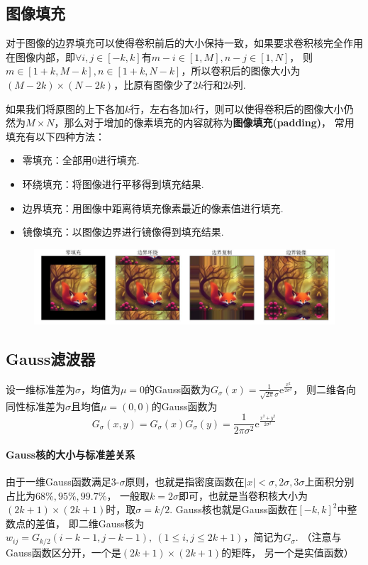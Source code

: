 \documentclass[12pt, a4paper, oneside]{ctexart}
\numberwithin{equation}{section}  %
\theoremstyle{definition}
\let\leq=\leqslant %
\def\e{\mathrm{e}}          %
\def\add{\vspace{1ex}}      %
\def\del{\vspace{-1.5ex}}   %
\begin{document}
\subsection{图像填充}
对于图像的边界填充可以使得卷积前后的大小保持一致，如果要求卷积核完全作用在图像内部，即$\forall i,j\in[-k,k]$有$m-i\in[1,M],n-j\in[1,N]$，
则$m\in[1+k,M-k],n\in[1+k,N-k]$，所以卷积后的图像大小为$(M-2k)\times(N-2k)$，比原有图像少了$2k$行和$2k$列.

如果我们将原图的上下各加$k$行，左右各加$k$行，则可以使得卷积后的图像大小仍然为$M\times N$，那么对于增加的像素填充的内容就称为\textbf{图像填充(padding)}，
常用填充有以下四种方法：
\begin{itemize}
    \item 零填充：全部用$0$进行填充.
    \item 环绕填充：将图像进行平移得到填充结果.
    \item 边界填充：用图像中距离待填充像素最近的像素值进行填充.
    \item 镜像填充：以图像边界进行镜像得到填充结果.
\end{itemize}
\begin{figure}[htbp]
    \centering
    \hspace*{-1.2cm}
    \includegraphics[scale=0.4]{图像填充.png}
\end{figure}

\subsection{Gauss滤波器}

设一维标准差为$\sigma$，均值为$\mu=0$的Gauss函数为$G_{\sigma}(x) = \frac{1}{\sqrt{2\pi}\sigma}\e^{\frac{x^2}{2\sigma^2}}$，
\add 则二维各向同性标准差为$\sigma$且均值$\mu=(0,0)$的Gauss函数为\del
\begin{equation*}
G_{\sigma}(x, y) = G_\sigma(x)G_\sigma(y) = \frac{1}{2\pi\sigma^2}\e^{\frac{x^2+y^2}{2\sigma^2}}
\end{equation*}

\paragraph{Gauss核的大小与标准差关系}由于一维Gauss函数满足3-$\sigma$原则，也就是指密度函数在$|x| < \sigma,2\sigma,3\sigma$上面积分别占比为$68\%,95\%,99.7\%$，
一般取$k=2\sigma$即可，也就是当卷积核大小为$(2k+1)\times(2k+1)$时，取$\sigma = k/2$. Gauss核也就是Gauss函数在$[-k,k]^2$中整数点的差值，
即二维Gauss核为$w_{ij} = G_{k/2}(i-k-1,j-k-1),\ (1\leq i,j\leq 2k+1)$，简记为$G_\sigma$. （注意与Gauss函数区分开，一个是$(2k+1)\times(2k+1)$的矩阵，
另一个是实值函数）
\end{document}
